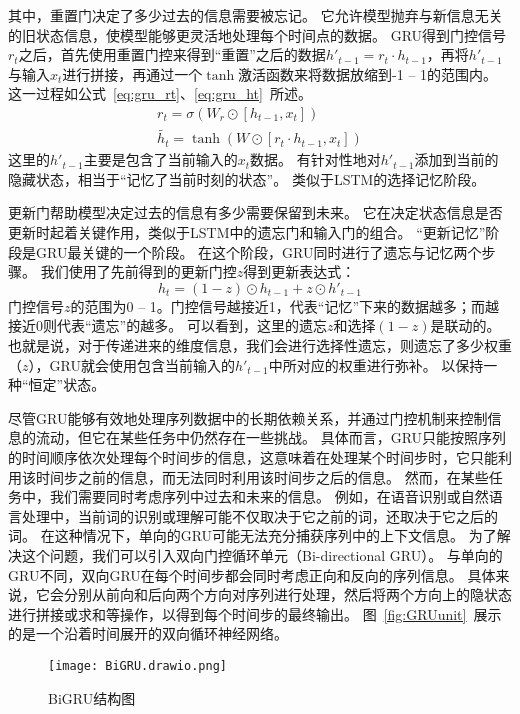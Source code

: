 其中，重置门决定了多少过去的信息需要被忘记。
它允许模型抛弃与新信息无关的旧状态信息，使模型能够更灵活地处理每个时间点的数据。
GRU得到门控信号$r_t$之后，首先使用重置门控来得到“重置”之后的数据$h'_{t-1} = r_t \cdot h_{t-1}$，再将$h'_{t-1}$与输入$x_t$进行拼接，再通过一个$\tanh$激活函数来将数据放缩到-1 -- 1的范围内。
这一过程如公式~\ref{eq:gru_rt}、\ref{eq:gru_ht}~所述。
\begin{gather}
  r_t = σ(W_r \odot [h_{t-1},x_t]) \label{eq:gru_rt} \\
  \tilde{h_t} = \tanh(W \odot [r_t \cdot h_{t-1} , x_t]) \label{eq:gru_ht}
\end{gather}
这里的$h'_{t-1}$主要是包含了当前输入的$x_t$数据。
有针对性地对$h'_{t-1}$添加到当前的隐藏状态，相当于“记忆了当前时刻的状态”。
类似于LSTM的选择记忆阶段。


更新门帮助模型决定过去的信息有多少需要保留到未来。
它在决定状态信息是否更新时起着关键作用，类似于LSTM中的遗忘门和输入门的组合。
“更新记忆”阶段是GRU最关键的一个阶段。
在这个阶段，GRU同时进行了遗忘与记忆两个步骤。
我们使用了先前得到的更新门控$z$得到更新表达式： 
\begin{equation}
  \label{dq:gru_ht}
  h_t = (1-z) \odot h_{t-1} + z \odot h'_{t-1}
\end{equation}
门控信号$z$的范围为0 -- 1。门控信号越接近1，代表“记忆”下来的数据越多；而越接近0则代表“遗忘”的越多。
可以看到，这里的遗忘$z$和选择$(1-z)$是联动的。
也就是说，对于传递进来的维度信息，我们会进行选择性遗忘，则遗忘了多少权重（$z$），GRU就会使用包含当前输入的$h'_{t-1}$中所对应的权重进行弥补。
以保持一种“恒定”状态。


尽管GRU能够有效地处理序列数据中的长期依赖关系，并通过门控机制来控制信息的流动，但它在某些任务中仍然存在一些挑战。
具体而言，GRU只能按照序列的时间顺序依次处理每个时间步的信息，这意味着在处理某个时间步时，它只能利用该时间步之前的信息，而无法同时利用该时间步之后的信息。
然而，在某些任务中，我们需要同时考虑序列中过去和未来的信息。
例如，在语音识别或自然语言处理中，当前词的识别或理解可能不仅取决于它之前的词，还取决于它之后的词。
在这种情况下，单向的GRU可能无法充分捕获序列中的上下文信息。
为了解决这个问题，我们可以引入双向门控循环单元（Bi-directional GRU）。
与单向的GRU不同，双向GRU在每个时间步都会同时考虑正向和反向的序列信息。
具体来说，它会分别从前向和后向两个方向对序列进行处理，然后将两个方向上的隐状态进行拼接或求和等操作，以得到每个时间步的最终输出。
图~\ref{fig:GRUunit}~展示的是一个沿着时间展开的双向循环神经网络。
\begin{figure}[h]
  \centering
  \texttt{[image: BiGRU.drawio.png]}
  \caption{BiGRU结构图}
  \label{fig:BiGRU}
\end{figure}


